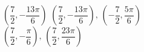 { $\left( \dfrac{7}{2}, -\dfrac{13\pi}{6} \right)$}
{$\left(\dfrac{7}{2}, -\dfrac{13\pi}{6} \right), \, \left( -\dfrac{7}{2}, \dfrac{5\pi}{6} \right)$\\$\left( \dfrac{7}{2}, -\dfrac{\pi}{6} \right), \, \left( \dfrac{7}{2}, \dfrac{23\pi}{6} \right)$\\ }
